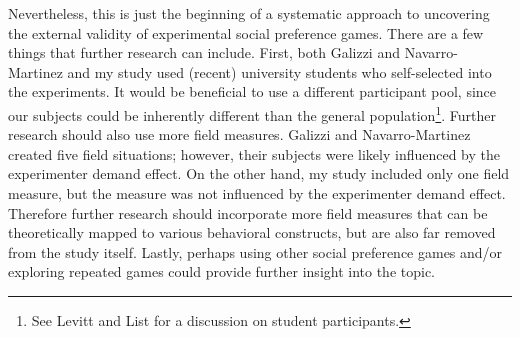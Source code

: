 \documentclass[12pt]{article}
\begin{document}
Nevertheless, this is just the beginning of a systematic approach to uncovering the external validity of experimental social preference games. There are a few things that further research can include. First, both Galizzi and Navarro-Martinez and my study used (recent) university students who self-selected into the experiments. It would be beneficial to use a different participant pool, since our subjects could be inherently different than the general population\footnote{See Levitt and List for a discussion on student participants.}. Further research should also use more field measures. Galizzi and Navarro-Martinez created five field situations; however, their subjects were likely influenced by the experimenter demand effect. On the other hand, my study included only one field measure, but the measure was not influenced by the experimenter demand effect. Therefore further research should incorporate more field measures that can be theoretically mapped to various behavioral constructs, but are also far removed from the study itself. Lastly, perhaps using other social preference games and/or exploring repeated games could provide further insight into the topic.




\newpage




%
\end{document}
